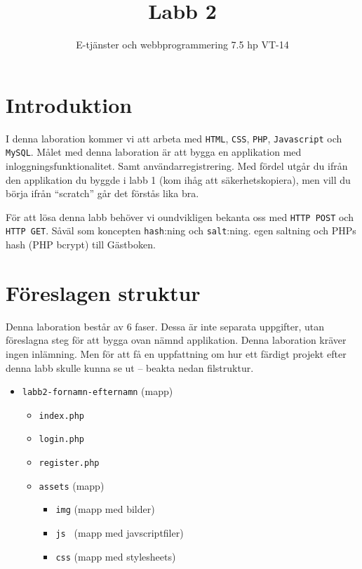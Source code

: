 \documentclass[12pt]{article}
\date{}
\title{ Labb 2 }
\author{ E-tjänster och webbprogrammering 7.5 hp VT-14 }
\begin{document}
\maketitle
\vspace{-2em}



\section{Introduktion}
I denna laboration kommer vi att arbeta med \texttt{HTML}, \texttt{CSS}, \texttt{PHP}, \texttt{Javascript} och \texttt{MySQL}. Målet med denna laboration är att bygga en applikation med inloggningsfunktionalitet. Samt användarregistrering. Med fördel utgår du ifrån den applikation du byggde i labb 1 (kom ihåg att säkerhetskopiera), men vill du börja ifrån ``scratch'' går det förstås lika bra.

För att lösa denna labb behöver vi oundvikligen bekanta oss med \texttt{HTTP POST} och \texttt{HTTP GET}. Såväl som koncepten \texttt{hash}:ning och \texttt{salt}:ning. egen saltning och PHPs hash (PHP bcrypt) till Gästboken.



\section{Föreslagen struktur}
Denna laboration består av 6 faser. Dessa är inte separata uppgifter, utan föreslagna steg för att bygga ovan nämnd applikation. Denna laboration kräver ingen inlämning. Men för att få en uppfattning om hur ett färdigt projekt efter denna labb skulle kunna se ut -- beakta nedan filstruktur.
  \begin{itemize}
    \item \texttt{labb2-fornamn-efternamn} (mapp)
      \begin{itemize}
        \item \texttt{index.php}
        \item \texttt{login.php}
        \item \texttt{register.php}
        \item \texttt{assets} (mapp)
      \begin{itemize}
        \item \texttt{img} (mapp med bilder)
        \item \texttt{js } (mapp med javscriptfiler)
	      \item \texttt{css} (mapp med stylesheets)
      \end{itemize}
    \end{itemize}
  \end{itemize}
\end{document}
